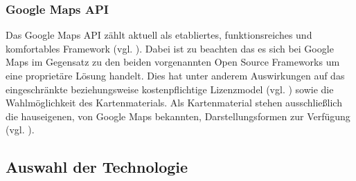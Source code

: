 \documentclass[../Bachelorarbeit.tex]{subfiles}
\begin{document}
\subsubsection{Google Maps \ac{API}}
Das Google Maps \ac{API} zählt aktuell als etabliertes, funktionsreiches und    komfortables Framework (vgl. \cite[Abschnitt: Google Maps]{TestingWebMapApi}).  
Dabei ist zu beachten das es sich bei Google Maps im Gegensatz zu den beiden vorgenannten Open Source Frameworks um eine proprietäre Lösung handelt. 
Dies hat unter anderem Auswirkungen auf das eingeschränkte beziehungsweise kostenpflichtige Lizenzmodel (vgl. \cite{GoogleMapsNutzung}) sowie die Wahlmöglichkeit des Kartenmaterials. 
Als Kartenmaterial stehen ausschließlich die hauseigenen, von Google Maps bekannten, Darstellungsformen zur Verfügung (vgl. \cite[Abschnitt: Google Maps]{TestingWebMapApi}). 


\subsection{Auswahl der Technologie}
\label{AuswahlDerTechnologie}
\end{document}
